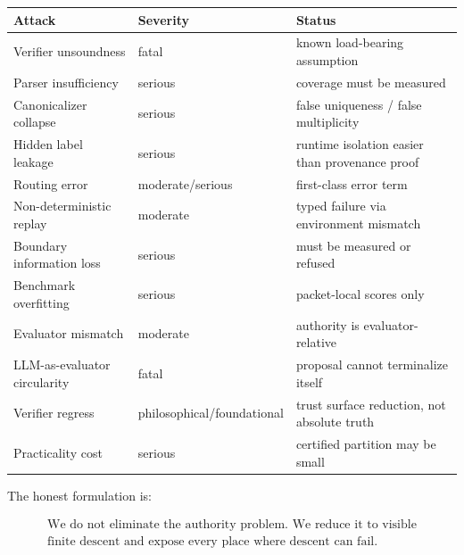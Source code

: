 \documentclass[
  10pt,
]{article}
\begin{document}
\begin{longtable}[]{@{}
  >{\raggedright\arraybackslash}p{}
  >{\raggedright\arraybackslash}p{}
  >{\raggedright\arraybackslash}p{}@{}}
\toprule\noalign{}
\begin{minipage}[b]{\linewidth}\raggedright
Attack
\end{minipage} & \begin{minipage}[b]{\linewidth}\raggedright
Severity
\end{minipage} & \begin{minipage}[b]{\linewidth}\raggedright
Status
\end{minipage} \\
\midrule\noalign{}
\endhead
\bottomrule\noalign{}
\endlastfoot
Verifier unsoundness & fatal & known load-bearing assumption \\
Parser insufficiency & serious & coverage must be measured \\
Canonicalizer collapse & serious & false uniqueness / false multiplicity \\
Hidden label leakage & serious & runtime isolation easier than provenance proof \\
Routing error & moderate/serious & first-class error term \\
Non-deterministic replay & moderate & typed failure via environment mismatch \\
Boundary information loss & serious & must be measured or refused \\
Benchmark overfitting & serious & packet-local scores only \\
Evaluator mismatch & moderate & authority is evaluator-relative \\
LLM-as-evaluator circularity & fatal & proposal cannot terminalize itself \\
Verifier regress & philosophical/foundational & trust surface reduction, not absolute truth \\
Practicality cost & serious & certified partition may be small \\
\end{longtable}

The honest formulation is:

\protect\hypertarget{math-E0165-0226}{}{\[
\boxed{
\begin{gathered}\text{We do not eliminate the authority problem. We reduce it to visible}\\
\text{finite descent and expose every place where descent can fail.}\end{gathered}
}
\]}
\end{document}
